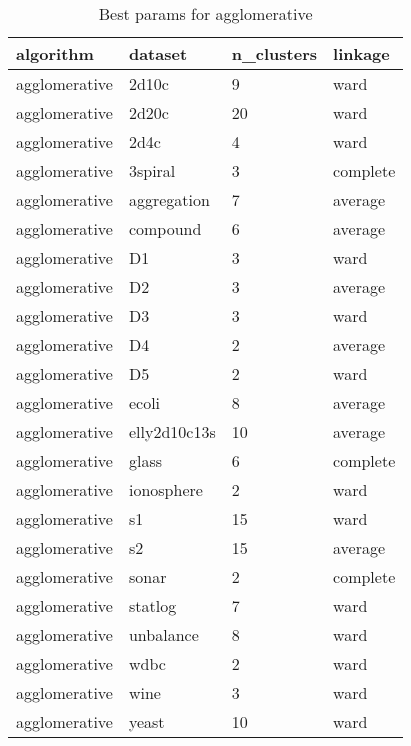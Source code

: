 \clearpage

\begin{table}[H]
\centering
\caption{Best params for agglomerative}
\label{S4_Table}
\begin{tabular}{|l|l|l|l|}
\hline
algorithm & dataset & n\_clusters & linkage \\
\hline
agglomerative & 2d10c & 9 & ward \\
\hline
agglomerative & 2d20c & 20 & ward \\
\hline
agglomerative & 2d4c & 4 & ward \\
\hline
agglomerative & 3spiral & 3 & complete \\
\hline
agglomerative & aggregation & 7 & average \\
\hline
agglomerative & compound & 6 & average \\
\hline
agglomerative & D1 & 3 & ward \\
\hline
agglomerative & D2 & 3 & average \\
\hline
agglomerative & D3 & 3 & ward \\
\hline
agglomerative & D4 & 2 & average \\
\hline
agglomerative & D5 & 2 & ward \\
\hline
agglomerative & ecoli & 8 & average \\
\hline
agglomerative & elly2d10c13s & 10 & average \\
\hline
agglomerative & glass & 6 & complete \\
\hline
agglomerative & ionosphere & 2 & ward \\
\hline
agglomerative & s1 & 15 & ward \\
\hline
agglomerative & s2 & 15 & average \\
\hline
agglomerative & sonar & 2 & complete \\
\hline
agglomerative & statlog & 7 & ward \\
\hline
agglomerative & unbalance & 8 & ward \\
\hline
agglomerative & wdbc & 2 & ward \\
\hline
agglomerative & wine & 3 & ward \\
\hline
agglomerative & yeast & 10 & ward \\
\hline
\end{tabular}
\end{table}

\clearpage

